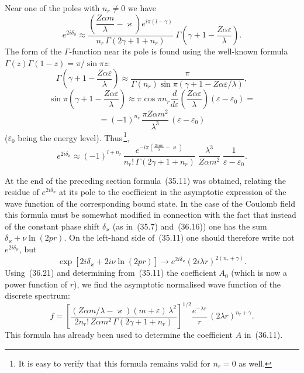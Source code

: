 Near one of the poles with $n_r \neq 0$ we have
\[
e^{2i\delta_\varkappa} \approx \frac{\left(\dfrac{Z\alpha m}{\lambda} - \varkappa\right)e^{i\pi(l-\gamma)}}{n_r\,\Gamma(2\gamma + 1 + n_r)}\;\Gamma\!\left(\gamma + 1 - \frac{Z\alpha\varepsilon}{\lambda}\right).
\]
The form of the $\Gamma$-function near its pole is found using the well-known formula $\Gamma(z)\Gamma(1-z) = \pi/\sin\pi z$:
\[
\Gamma\!\left(\gamma + 1 - \frac{Z\alpha\varepsilon}{\lambda}\right) \approx \frac{\pi}{\Gamma(n_r)\sin\pi(\gamma + 1 - Z\alpha\varepsilon/\lambda)},
\]
\[
\sin\pi\!\left(\gamma + 1 - \frac{Z\alpha\varepsilon}{\lambda}\right) \approx \pi\cos\pi n_r \frac{d}{d\varepsilon}\!\left(\frac{Z\alpha\varepsilon}{\lambda}\right)(\varepsilon - \varepsilon_0) =
\]
\[
= (-1)^{n_r}\,\frac{\pi Z\alpha m^2}{\lambda^3}\,(\varepsilon - \varepsilon_0)
\]
($\varepsilon_0$ being the energy level). Thus\,\footnote{It is easy to verify that this formula remains valid for $n_r = 0$ as well.},
\begin{equation}
e^{2i\delta_\varkappa} \approx (-1)^{l+n_r}\,\frac{e^{-i\pi\left(\frac{Z\alpha m}{\lambda}-\varkappa\right)}}{n_r!\,\Gamma(2\gamma+1+n_r)}\;\frac{\lambda^3}{Z\alpha m^2}\;\frac{1}{\varepsilon-\varepsilon_0}.
\tag{36.21}
\end{equation}

At the end of the preceding section formula~(35.11) was obtained, relating the residue of $e^{2i\delta_\varkappa}$ at its pole to the coefficient in the asymptotic expression of the wave function of the corresponding bound state. In the case of the Coulomb field this formula must be somewhat modified in connection with the fact that instead of the constant phase shift $\delta_\varkappa$ (as in~(35.7) and~(36.16)) one has the sum $\delta_\varkappa + \nu\ln(2pr)$. On the left-hand side of~(35.11) one should therefore write not $e^{2i\delta_\varkappa}$, but
\[
\exp[2i\delta_\varkappa + 2i\nu\ln(2pr)] \to e^{2i\delta_\varkappa}(2i\lambda r)^{2(n_r+\gamma)}.
\]
Using~(36.21) and determining from~(35.11) the coefficient $A_0$ (which is now a power function of $r$), we find the asymptotic normalised wave function of the discrete spectrum:
\begin{equation}
f = \left[\frac{(Z\alpha m/\lambda - \varkappa)(m+\varepsilon)\,\lambda^2}{2n_r!\,Z\alpha m^2\,\Gamma(2\gamma+1+n_r)}\right]^{1/2}\frac{e^{-\lambda r}}{r}\,(2\lambda r)^{n_r+\gamma}.
\tag{36.22}
\end{equation}
This formula has already been used to determine the coefficient $A$ in~(36.11).
